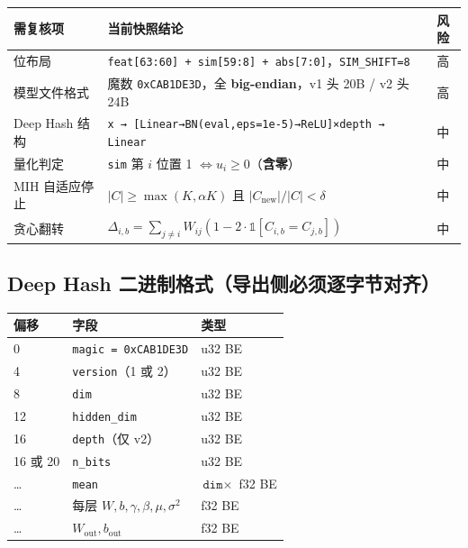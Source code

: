 \documentclass[11pt,a4paper]{ctexart}
\theoremstyle{definition}
\begin{document}
\vspace{0.2cm}

\begin{center}
\begin{tabularx}{\textwidth}{@{}lXc@{}}
\toprule
\textbf{需复核项} & \textbf{当前快照结论} & \textbf{风险} \\
\midrule
位布局 & \texttt{feat[63:60] + sim[59:8] + abs[7:0]}，\texttt{SIM\_SHIFT=8} & 高 \\
模型文件格式 & 魔数 \texttt{0xCAB1DE3D}，全 \textbf{big-endian}，v1 头 20B / v2 头 24B & 高 \\
Deep Hash 结构 & \texttt{x → [Linear→BN(eval,eps=1e-5)→ReLU]×depth → Linear} & 中 \\
量化判定 & \texttt{sim} 第 $i$ 位置 1 $\iff u_i \ge 0$（\textbf{含零}） & 中 \\
MIH 自适应停止 & $|C|\ge\max(K,\alpha K)$ 且 $|C_{\text{new}}|/|C|<\delta$ & 中 \\
贪心翻转 & $\Delta_{i,b}=\sum_{j\ne i}W_{ij}(1-2\cdot\mathbb{1}[C_{i,b}=C_{j,b}])$ & 中 \\
\bottomrule
\end{tabularx}
\end{center}

\subsection{Deep Hash 二进制格式（导出侧必须逐字节对齐）}

\begin{center}
\begin{tabularx}{\textwidth}{@{}llX@{}}
\toprule
\textbf{偏移} & \textbf{字段} & \textbf{类型} \\
\midrule
0 & \texttt{magic = 0xCAB1DE3D} & u32 BE \\
4 & \texttt{version}（1 或 2） & u32 BE \\
8 & \texttt{dim} & u32 BE \\
12 & \texttt{hidden\_dim} & u32 BE \\
16 & \texttt{depth}（仅 v2） & u32 BE \\
16 或 20 & \texttt{n\_bits} & u32 BE \\
\dots & \texttt{mean} & $\texttt{dim}\times$ f32 BE \\
\dots & 每层 $W,b,\gamma,\beta,\mu,\sigma^2$ & f32 BE \\
\dots & $W_{\text{out}}, b_{\text{out}}$ & f32 BE \\
\bottomrule
\end{tabularx}
\end{center}
\end{document}
